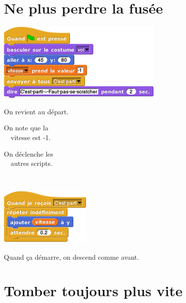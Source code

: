 \documentclass[a7paper,pagesize,DIV=14,10pt]{scrbook}
\begin{document}
\newpage

\section*{Ne plus perdre la fusée}
\vspace{-.7\baselineskip}

\begin{minipage}[b]{.53\linewidth}
  \includegraphics[scale=.5]{img/fusee_init.png}
\end{minipage}
\begin{minipage}[b]{.48\linewidth}
  \hspace{-2.5mm}On revient au départ.

  On note que la \\ 
  \null~~vitesse est -1.

  On déclenche les \\ 
  \null~~autres scripts.

  \vspace{.3\baselineskip}~
\end{minipage}


\begin{minipage}{.53\linewidth}
  \includegraphics[scale=.5]{img/fusee_descendre.png}
\end{minipage}
\begin{minipage}{.47\linewidth}
  Quand ça démarre, on descend comme avant.
\end{minipage}

\vspace{-.7\baselineskip}
\section*{Tomber toujours plus vite}
\vspace{-.7\baselineskip}
\end{document}
